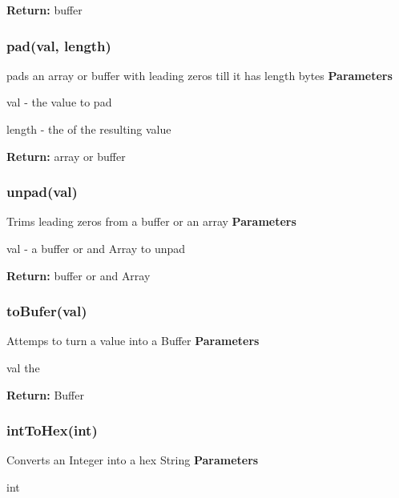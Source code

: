 {\bfseries Return\+:} {\ttfamily buffer}

\subsubsection*{{\ttfamily pad(val, length)}}

pads an {\ttfamily array} or {\ttfamily buffer} with leading zeros till it has {\ttfamily length} bytes {\bfseries Parameters}
\begin{DoxyItemize}
\item {\ttfamily val} -\/ the value to pad
\item {\ttfamily length} -\/ the of the resulting value
\end{DoxyItemize}

{\bfseries Return\+:} {\ttfamily array} or {\ttfamily buffer}

\subsubsection*{{\ttfamily unpad(val)}}

Trims leading zeros from a buffer or an array {\bfseries Parameters}
\begin{DoxyItemize}
\item {\ttfamily val} -\/ a {\ttfamily buffer} or and {\ttfamily Array} to unpad
\end{DoxyItemize}

{\bfseries Return\+:} {\ttfamily buffer} or and {\ttfamily Array}

\subsubsection*{{\ttfamily to\+Bufer(val)}}

Attemps to turn a value into a Buffer {\bfseries Parameters}
\begin{DoxyItemize}
\item {\ttfamily val} the
\end{DoxyItemize}

{\bfseries Return\+:} {\ttfamily Buffer}

\subsubsection*{{\ttfamily int\+To\+Hex(int)}}

Converts an {\ttfamily Integer} into a hex {\ttfamily String} {\bfseries Parameters}
\begin{DoxyItemize}
\item {\ttfamily int}
\end{DoxyItemize}


